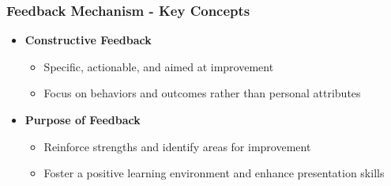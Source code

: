 \documentclass[aspectratio=169]{beamer}
\begin{document}
\begin{frame}[fragile]
    \frametitle{Feedback Mechanism - Key Concepts}
    \begin{itemize}
        \item \textbf{Constructive Feedback}
        \begin{itemize}
            \item Specific, actionable, and aimed at improvement
            \item Focus on behaviors and outcomes rather than personal attributes
        \end{itemize}
        
        \item \textbf{Purpose of Feedback}
        \begin{itemize}
            \item Reinforce strengths and identify areas for improvement
            \item Foster a positive learning environment and enhance presentation skills
        \end{itemize}
    \end{itemize}
\end{frame}
\end{document}
